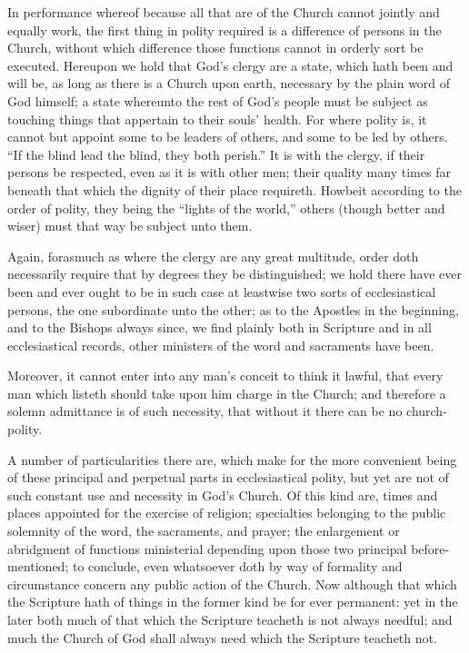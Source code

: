 In performance whereof because all that are of the Church cannot jointly and equally work, the first thing in polity required is a difference of persons in the Church, without which difference those functions cannot in orderly sort be executed. Hereupon we hold that God’s clergy are a state, which hath been and will be, as long as there is a Church upon earth, necessary by the plain word of God himself; a state whereunto the rest of God’s people must be subject as touching things that appertain to their souls’ health. For where polity is, it cannot but appoint some to be leaders of others, and some to be led by others. “If the blind lead the blind, they both perish.” It is with the clergy, if their persons be respected, even as it is with other men; their quality many times far beneath that which the dignity of their place requireth. Howbeit according to the order of polity, they being the “lights of the world,” others (though better and wiser) must that way be subject unto them.

Again, forasmuch as where the clergy are any great multitude, order doth necessarily require that by degrees they be distinguished; we hold there have ever been and ever ought to be in such case at leastwise two sorts of ecclesiastical persons, the one subordinate unto the other; as to the Apostles in the beginning, and to the Bishops always since, we find plainly both in Scripture and in all ecclesiastical records, other ministers of the word and sacraments have been.

Moreover, it cannot enter into any man’s conceit to think  it lawful, that every man which listeth should take upon him charge in the Church; and therefore a solemn admittance is of such necessity, that without it there can be no church-polity.

A number of particularities there are, which make for the more convenient being of these principal and perpetual parts in ecclesiastical polity, but yet are not of such constant use and necessity in God’s Church. Of this kind are, times and places appointed for the exercise of religion; specialties belonging to the public solemnity of the word, the sacraments, and prayer; the enlargement or abridgment of functions ministerial depending upon those two principal before-mentioned; to conclude, even whatsoever doth by way of formality and circumstance concern any public action of the Church. Now although that which the Scripture hath of things in the former kind be for ever permanent: yet in the later both much of that which the Scripture teacheth is not always needful; and much the Church of God shall always need which the Scripture teacheth not.

